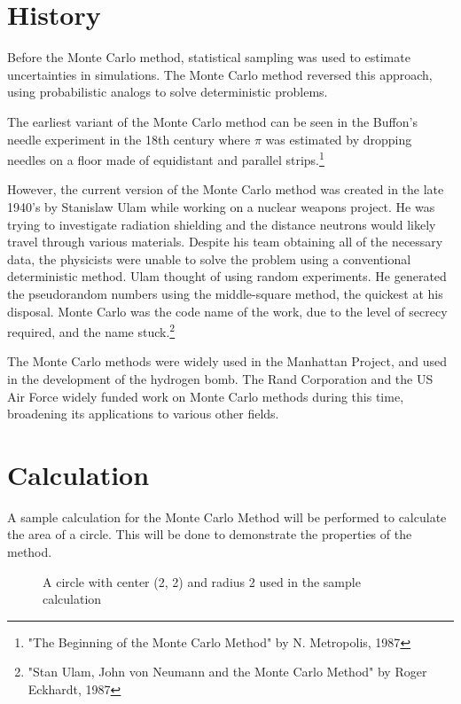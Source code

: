\documentclass[10pt, letterpaper]{article}
\begin{document}
  \section{History}

  Before the Monte Carlo method, statistical sampling was used to estimate uncertainties in simulations. The Monte Carlo method
  reversed this approach, using probabilistic analogs to solve deterministic problems.

  The earliest variant of the Monte Carlo method can be seen in the Buffon's needle experiment in the 18th century where $\pi$ was estimated
  by dropping needles on a floor made of equidistant and parallel strips.\footnote{"The Beginning of the Monte Carlo Method" by N. Metropolis, 1987}

  However, the current version of the Monte Carlo method was created in the late 1940's by Stanislaw Ulam while working on
  a nuclear weapons project. He was trying to investigate radiation shielding and the distance neutrons would likely travel through various
  materials. Despite his team obtaining all of the necessary data, the physicists were unable to solve the problem using a conventional deterministic
  method. Ulam thought of using random experiments. He generated the pseudorandom numbers using the middle-square method, the quickest at his
  disposal. Monte Carlo was the code name of the work, due to the level of secrecy required, and the name stuck.\footnote{"Stan Ulam, John von
  Neumann and the Monte Carlo Method" by Roger Eckhardt, 1987}

  The Monte Carlo methods were widely used in the Manhattan Project, and used in the development of the hydrogen bomb. The Rand Corporation
  and the US Air Force widely funded work on Monte Carlo methods during this time, broadening its applications to various other fields.

  \section{Calculation} \label{sec:usage}

  A sample calculation for the Monte Carlo Method will be performed to calculate the area of a circle. This will be done to demonstrate the properties of
  the method.

  \begin{figure}
    \centering
    \caption{A circle with center (2, 2) and radius 2 used in the sample calculation} \label{fig:circle}
  \end{figure}
\end{document}
